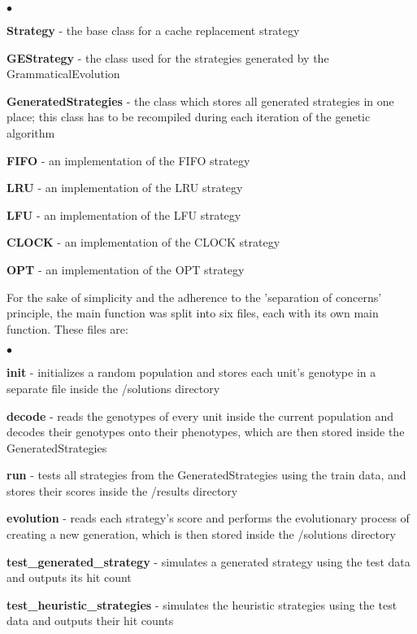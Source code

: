 \begin{list}{$\bullet$}{}  	
	\item \textbf{Strategy} - the base class for a cache replacement strategy
	\item \textbf{GEStrategy} - the class used for the strategies generated by the GrammaticalEvolution
	\item \textbf{GeneratedStrategies} - the class which stores all generated strategies in one place; this class has to be recompiled during each iteration of the genetic algorithm
	\item \textbf{FIFO} - an implementation of the FIFO strategy
	\item \textbf{LRU} - an implementation of the LRU strategy
	\item \textbf{LFU} - an implementation of the LFU strategy
	\item \textbf{CLOCK} - an implementation of the CLOCK strategy
	\item \textbf{OPT} - an implementation of the OPT strategy
\end{list}

For the sake of simplicity and the adherence to the 'separation of concerns' principle, the main function was split into six files, each with its own main function. These files are:

\begin{list}{$\bullet$}{}  	
	\item \textbf{init} - initializes a random population and stores each unit's genotype in a separate file inside the /solutions directory
	\item \textbf{decode} - reads the genotypes of every unit inside the current population and decodes their genotypes onto their phenotypes, which are then stored inside the GeneratedStrategies
	\item \textbf{run} - tests all strategies from the GeneratedStrategies using the train data, and stores their scores inside the /results directory
	\item \textbf{evolution} - reads each strategy's score and performs the evolutionary process of creating a new generation, which is then stored inside the /solutions directory
	\item \textbf{test\_generated\_strategy} - simulates a generated strategy using the test data and outputs its hit count
	\item \textbf{test\_heuristic\_strategies} - simulates the heuristic strategies using the test data and outputs their hit counts
\end{list}

